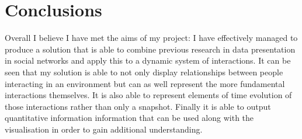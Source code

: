 \documentclass[12pt,a4paper]{article}
\begin{document}
%	
%	
%
%
%
%
%
%
%
%

\section{Conclusions}
\noindent
Overall I believe I have met the aims of my project: I have effectively managed to produce a solution that is able to combine previous research in data presentation in social networks and apply this to a dynamic system of interactions. It can be seen that my solution is able to not only display relationships between people interacting in an environment but can as well represent the more fundamental interactions themselves. It is also able to represent elements of time evolution of those interactions rather than only a snapshot. Finally it is able to output quantitative information information that can be used along with the visualisation in order to gain additional understanding.
\end{document}
